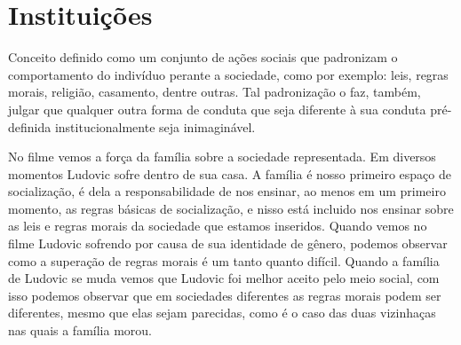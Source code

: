 \documentclass[
	12pt,				%
	openany,
	oneside,			%
	a4paper,			%
	chapter=TITLE,		%
	english,			%
	brazil				%
]{abntex2}
\begin{document}
\chapter{Instituições}
Conceito definido como um conjunto de ações sociais que padronizam o comportamento do indivíduo perante a sociedade, como por exemplo: leis, regras morais, religião, casamento, dentre outras. Tal padronização o faz, também, julgar que qualquer outra forma de conduta que seja diferente à sua conduta pré-definida institucionalmente seja inimaginável.

No filme \cite{minhaVidaEmCorDeRosa} vemos a força da família sobre a sociedade representada. Em diversos momentos Ludovic sofre dentro de sua casa. A família é nosso primeiro espaço de socialização, é dela a responsabilidade de nos ensinar, ao menos em um primeiro momento, as regras básicas de socialização, e nisso está incluido nos ensinar sobre as leis e regras morais da sociedade que estamos inseridos. Quando vemos no filme Ludovic sofrendo por causa de sua identidade de gênero, podemos observar como a superação de regras morais é um tanto quanto difícil. Quando a família de Ludovic se muda vemos que Ludovic foi melhor aceito pelo meio social, com isso podemos observar que em sociedades diferentes as regras morais podem ser diferentes, mesmo que elas sejam parecidas, como é o caso das duas vizinhaças nas quais a família morou.

\postextual


\end{document}
